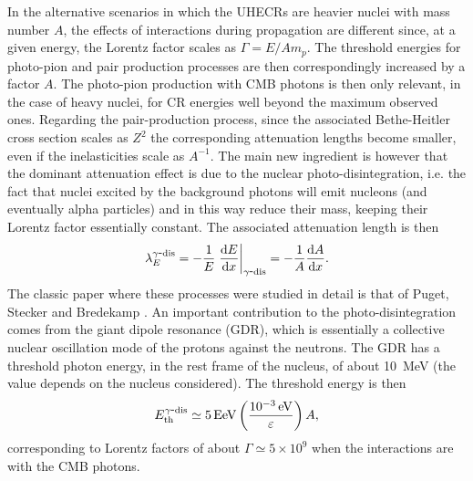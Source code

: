 \documentclass[twoside,12pt]{article}
\newcommand{\be}{\begin{equation}}
\newcommand{\ee}{\end{equation}}
\begin{document}
In the alternative scenarios in which the UHECRs are heavier nuclei  with mass number $A$, the effects of interactions during propagation are different since, at a given energy, the Lorentz factor scales as $\Gamma=E/Am_p$. The threshold energies for photo-pion and pair production processes are then correspondingly increased by a factor $A$. The photo-pion production with CMB photons is then only relevant, in the case of heavy nuclei, for CR energies well beyond the maximum observed ones. Regarding the pair-production process, since the associated Bethe-Heitler cross section scales as $Z^2$ the corresponding attenuation lengths become smaller, even if the inelasticities scale as $A^{-1}$. The main new ingredient is however  that the dominant attenuation effect is due to the nuclear photo-disintegration, i.e. the fact that nuclei excited by the background photons will emit nucleons (and eventually alpha particles) and in this way reduce their mass, keeping their Lorentz factor essentially constant. The associated attenuation length is then 
\be 
\lambda_E^{\gamma\hbox{-}{\rm dis}}=-\frac{1}{E}\left.\frac{{\rm d}E}{{\rm d}x}\right|_{\gamma\hbox{-}{\rm dis}}=-\frac{1}{A}\frac{{\rm d}A}{{\rm d}x}.
\ee
 The classic paper where these processes were studied in detail is that of Puget, Stecker and Bredekamp \cite{psb}. An important contribution to the photo-disintegration comes from the giant dipole resonance (GDR), which is essentially a collective nuclear oscillation mode of the protons against the neutrons. The GDR has a threshold photon energy, in the rest frame of the nucleus, of about 10~MeV (the value depends on the nucleus considered). The threshold energy is then
\be 
E^{\gamma\hbox{-}{\rm dis}}_{\rm th}\simeq  5\,{\rm EeV}\left(\frac{10^{-3}\,{\rm eV}}{\varepsilon}\right)A,
\label{ethpdis}
\ee
corresponding to Lorentz factors of about $\Gamma\simeq 5\times 10^{9}$ when the interactions are with the CMB photons.
\end{document}
